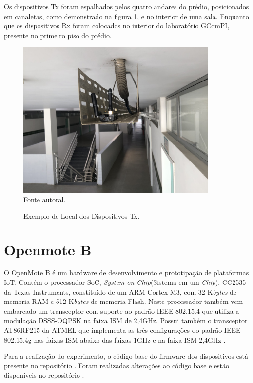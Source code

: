 Os dispositivos Tx foram espalhados pelos quatro andares do prédio, posicionados em canaletas, como demonstrado na figura \ref{fig:tx_canaleta}, e no interior de uma sala. Enquanto que os dispositivos Rx foram colocados no interior do laboratório GComPI, presente no primeiro piso do prédio.

\begin{figure}[h]
    \begin{center}
        \caption{Exemplo de Local dos Dispositivos Tx.}
        \includegraphics[width=10cm]{./sections/textual/chapters/images/tx_canaleta.jpg}\\
        Fonte autoral.
        \label{fig:tx_canaleta}
    \end{center}
\end{figure}

\section{Openmote B}
O OpenMote B é um hardware de desenvolvimento e prototipação de plataformas IoT. Contém o processador SoC, \emph{System-on-Chip}(Sistema em um \emph{Chip}), CC2535 da Texas Instruments, constituído de um ARM Cortex-M3, com 32 K\emph{bytes} de memoria RAM e 512 K\emph{bytes} de memoria Flash. Neste processador também vem embarcado um transceptor com suporte ao padrão IEEE 802.15.4 que utiliza a modulação DSSS-OQPSK na faixa ISM de 2,4GHz. Possui também o transceptor AT86RF215 da ATMEL que implementa as três configurações do padrão IEEE 802.15.4g nas faixas ISM abaixo das faixas 1GHz e na faixa ISM 2,4GHz \cite{openmoteb-userguide}.

Para a realização do experimento, o código base do firmware dos dispositivos está presente no repositório \cite{openmoteb-firmware}. Foram realizadas alterações ao código base e estão disponíveis no repositório \cite{openmoteb-gcompi}.

